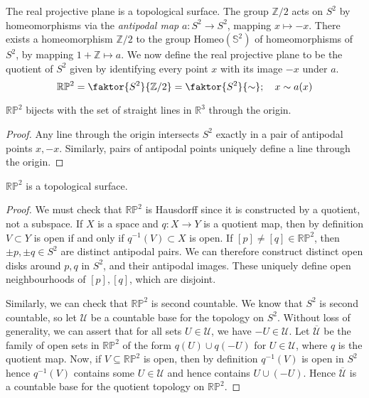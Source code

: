 \begin{example}
	The real projective plane is a topological surface.
	The group \( \mathbb Z / 2 \) acts on \( S^2 \) by homeomorphisms via the \textit{antipodal map} \( a \colon S^2 \to S^2 \), mapping \( x \mapsto -x \).
	There exists a homeomorphism \( \mathbb Z / 2 \) to the group \( \mathrm{Homeo}(\mathbb S^2) \) of homeomorphisms of \( S^2 \), by mapping \( 1 + \mathbb Z \mapsto a \).
	We now define the real projective plane to be the quotient of \( S^2 \) given by identifying every point \( x \) with its image \( -x \) under \( a \).
	\[
		\mathbb R \mathbb P^2 = \faktor{S^2}{\mathbb Z/2} = \faktor{S^2}{\sim};\quad x \sim a(x)
	\]
	\begin{lemma}
		\( \mathbb R \mathbb P^2 \) bijects with the set of straight lines in \( \mathbb R^3 \) through the origin.
	\end{lemma}
	\begin{proof}
		Any line through the origin intersects \( S^2 \) exactly in a pair of antipodal points \( x, -x \).
		Similarly, pairs of antipodal points uniquely define a line through the origin.
	\end{proof}
	\begin{lemma}
		\( \mathbb R \mathbb P^2 \) is a topological surface.
	\end{lemma}
	\begin{proof}
		We must check that \( \mathbb R \mathbb P^2 \) is Hausdorff since it is constructed by a quotient, not a subspace.
		If \( X \) is a space and \( q \colon X \to Y \) is a quotient map, then by definition \( V \subset Y \) is open if and only if \( q^{-1}(V) \subset X \) is open.
		If \( [p] \neq [q] \in \mathbb R \mathbb P^2 \), then \( \pm p, \pm q \in S^2 \) are distinct antipodal pairs.
		We can therefore construct distinct open disks around \( p, q \) in \( S^2 \), and their antipodal images.
		These uniquely define open neighbourhoods of \( [p], [q] \), which are disjoint.

		Similarly, we can check that \( \mathbb R \mathbb P^2 \) is second countable.
		We know that \( S^2 \) is second countable, so let \( \mathcal U \) be a countable base for the topology on \( S^2 \).
		Without loss of generality, we can assert that for all sets \( U \in \mathcal U \), we have \( -U \in \mathcal U \).
		Let \( \overline{\mathcal U} \) be the family of open sets in \( \mathbb R \mathbb P^2 \) of the form \( q(U) \cup q(-U) \) for \( U \in \mathcal U \), where \( q \) is the quotient map.
		Now, if \( V \subseteq \mathbb R \mathbb P^2 \) is open, then by definition \( q^{-1}(V) \) is open in \( S^2 \) hence \( q^{-1}(V) \) contains some \( U \in \mathcal U \) and hence contains \( U \cup (-U) \).
		Hence \( \overline{\mathcal U} \) is a countable base for the quotient topology on \( \mathbb R \mathbb P^2 \).


\end{proof}
\end{example}
